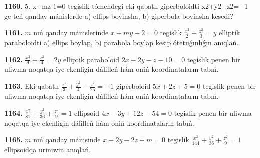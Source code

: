 \textbf {1160.} 5. x+mz-1=0 tegislik tómendegi eki qabatlı giperboloidti x2+y2−z2=−1 ge teń qanday mánislerde a) ellips boyinsha, b) giperbola boyinsha kesedi?



\textbf {1161.} $m$ nıń qanday mánislerinde $x+m y-2=0$ tegislik $\frac{x^2}{2}+\frac{z^2}{3}=y$ elliptik paraboloidti a) ellips boylap, b) parabola boylap kesip ótetuǵınlıǵın anıqlań.

\textbf{1162.} $\frac{x^2}{9}+\frac{z^2}{4}=2 y$ elliptik paraboloid $2 x-2 y-z-10=0$ tegislik penen bir uliwma noqatqa iye ekenligin dálilleń hám oniń koordinataların tabıń.

\textbf{1163.} Eki qabatlı $\frac{x^2}{3}+\frac{y^2}{4}-\frac{z^2}{25}=-1$ giperboloid $5 x+2 z+5=0$ tegislik penen bir uliwma noqatqa iye ekenligin dálilleń hám oniń koordinataların tabıń.

\textbf{1164.} $\frac{x^2}{81}+\frac{y^2}{36}+\frac{z^2}{9}=1$ ellipsoid $4 x-3 y+12 z-54=0$ tegislik penen bir uliwma noqatqa iye ekenligin dálilleń hám oniń koordinataların tabıń.

\textbf{1165.} $m$ nıń qanday mánisinde $x-2 y-2 z+m=0$ tegislik $\frac{x^2}{144}+\frac{y^2}{36}+\frac{z^2}{9}=1$ ellipsoidqa uriniwin anıqlań.

